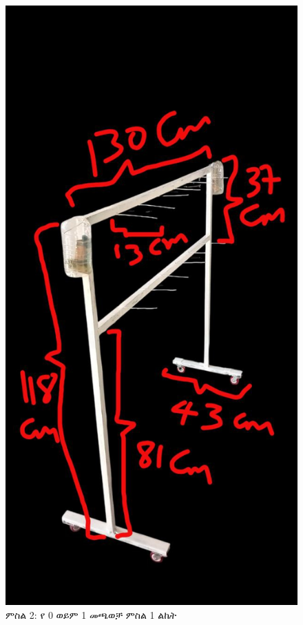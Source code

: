 \documentclass[a4paper,12pt]{article}
\begin{document}
\begin{center}
\begin{figure}[h!]
\centering
\includegraphics[scale=0.3]{0or1}
\caption{ምስል 2: የ 0 ወይም 1 መጫወቻ ምስል 1 ልኬት}
\end{figure}
\end{center}
\end{document}
